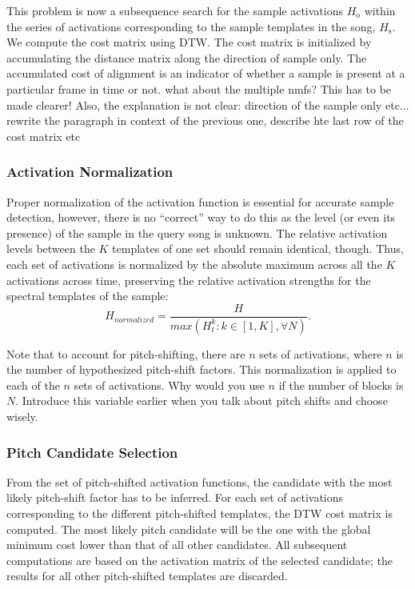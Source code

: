 \documentclass{article}
\begin{document}
This problem is now a subsequence search for the sample activations $H_\mathrm{o}$ within the series of activations corresponding to the sample templates in the song, $H_\mathrm{s}$. We compute the cost matrix using DTW. The cost matrix is initialized by accumulating the distance matrix along the direction of sample only. The accumulated cost of alignment is an indicator of whether a sample is present at a particular frame in time or not. {\color{red}what about the multiple nmfs? This has to be made clearer! Also, the explanation is not clear: direction of the sample only etc... rewrite the paragraph in context of the previous one, describe hte last row of the cost matrix etc}

\subsubsection{Activation Normalization}
Proper normalization of the activation function is essential for accurate sample detection, however, there is no ``correct'' way to do this as the level (or even its presence) of the sample in the query song is unknown. The relative activation levels between the $K$ templates of one set should remain identical, though. Thus, each set of activations is normalized by the absolute maximum across all the $K$ activations across time, preserving the relative activation strengths for the spectral templates of the sample:
%
\begin{equation}
H_{normalized} = \frac{H}{max(H^{k}_{t}: k\in[1,K], \forall N )}.
\end{equation}

Note that to account for pitch-shifting, there are $n$ sets of activations, where $n$ is the number of hypothesized pitch-shift factors. This normalization is applied to each of the $n$ sets of activations. 
{\color{red}Why would you use $n$ if the number of blocks is $N$. Introduce this variable earlier when you talk about pitch shifts and choose wisely.}

\subsubsection{Pitch Candidate Selection}
From the set of pitch-shifted activation functions, the candidate with the most likely pitch-shift factor has to be inferred. For each set of activations corresponding to the different pitch-shifted templates, the DTW cost matrix is computed. The most likely pitch candidate will be the one with the global minimum cost lower than that of all other candidates. All subsequent computations are based on the activation matrix of the selected candidate; the results for all other pitch-shifted templates are discarded.
\end{document}
